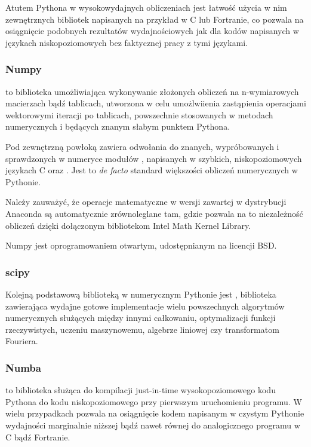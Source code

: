     Atutem Pythona w wysokowydajnych obliczeniach jest łatwość użycia w
    nim zewnętrznych bibliotek napisanych na przykład w C lub Fortranie, co
    pozwala na osiągnięcie podobnych rezultatów wydajnościowych jak dla kodów
    napisanych w językach niskopoziomowych bez faktycznej pracy z tymi
    językami.




    \subsubsection{Numpy}
    \cite{numpy} to biblioteka umożliwiająca wykonywanie złożonych obliczeń na
    n-wymiarowych macierzach bądź tablicach, utworzona w celu umożlwiienia
    zastąpienia operacjami wektorowymi iteracji po tablicach, powszechnie
    stosowanych w metodach numerycznych i będących znanym słabym punktem
    Pythona.

    Pod zewnętrzną powłoką zawiera odwołania do znanych, wypróbowanych i
    sprawdzonych w numeryce modułów ,  napisanych w
    szybkich, niskopoziomowych językach C oraz .  Jest to
    \emph{de facto} standard większości obliczeń numerycznych w Pythonie.

    Należy zauważyć, że operacje matematyczne w wersji  zawartej
    w dystrybucji Anaconda są automatycznie
    zrównoleglane tam, gdzie pozwala na to
        niezależność obliczeń dzięki dołączonym bibliotekom Intel Math Kernel Library.\cite{intel-mkl} 

    Numpy jest oprogramowaniem otwartym, udostępnianym na licencji BSD.


    \subsubsection{scipy}
    Kolejną podstawową biblioteką w numerycznym Pythonie jest ,
    biblioteka zawierająca wydajne gotowe implementacje wielu powszechnych algorytmów
    numerycznych służących między innymi całkowaniu, optymalizacji funkcji rzeczywistych,
    uczeniu maszynowemu, algebrze liniowej czy transformatom Fouriera.

    \subsubsection{Numba}
     to biblioteka służąca do kompilacji just-in-time wysokopoziomowego
    kodu Pythona do kodu niskopoziomowego przy pierwszym uruchomieniu programu. W
    wielu przypadkach pozwala na osiągnięcie kodem napisanym w czystym Pythonie
    wydajności marginalnie niższej bądź nawet równej do analogicznego programu w C
    bądź Fortranie. \cite{numba}

